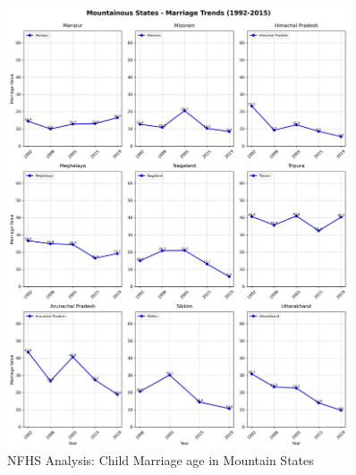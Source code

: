 

\begin{figure}[H]
    \centering
    \includegraphics[width=0.9\textwidth]{figures/nfhs/mountainous_states_marriage_subplots.pdf}
    \caption{NFHS Analysis: Child Marriage age in Mountain States}
    \label{fig:nfhs_mountain_marriage}
\end{figure}


